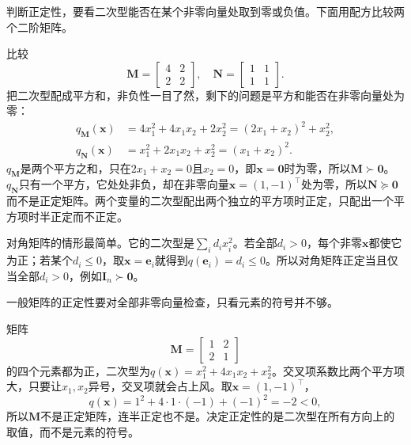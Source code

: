判断正定性，要看二次型能否在某个非零向量处取到零或负值。下面用配方比较两个二阶矩阵。
\begin{example}[用配方区分正定与半正定]
\label{ex:ls-pd-psd-completing-square}
比较
\[
 \bm M=\begin{bmatrix}4&2\\2&2\end{bmatrix},\quad
 \bm N=\begin{bmatrix}1&1\\1&1\end{bmatrix}.
\]
把二次型配成平方和，非负性一目了然，剩下的问题是平方和能否在非零向量处为零：
\[
 \begin{aligned}
 q_{\bm M}(\bm x)&=4x_1^2+4x_1x_2+2x_2^2=(2x_1+x_2)^2+x_2^2,\\
 q_{\bm N}(\bm x)&=x_1^2+2x_1x_2+x_2^2=(x_1+x_2)^2.
 \end{aligned}
\]
$q_{\bm M}$是两个平方之和，只在$2x_1+x_2=0$且$x_2=0$，即$\bm x=\bm0$时为零，所以$\bm M\succ\bm0$。$q_{\bm N}$只有一个平方，它处处非负，却在非零向量$\bm x=(1,-1)^\top$处为零，所以$\bm N\succeq\bm0$而不是正定矩阵。两个变量的二次型配出两个独立的平方项时正定，只配出一个平方项时半正定而不正定。
\end{example}

对角矩阵的情形最简单。它的二次型是$\sum_id_ix_i^2$。若全部$d_i>0$，每个非零$\bm x$都使它为正；若某个$d_i\leq0$，取$\bm x=\bm e_i$就得到$q(\bm e_i)=d_i\leq0$。所以对角矩阵正定当且仅当全部$d_i>0$，例如$\bm I_n\succ\bm0$。

一般矩阵的正定性要对全部非零向量检查，只看元素的符号并不够。
\begin{example}[反例：元素全为正的对称矩阵未必正定]
\label{ex:ls-positive-entries-not-pd}
矩阵
\[
 \bm M=\begin{bmatrix}1&2\\2&1\end{bmatrix}
\]
的四个元素都为正，二次型为$q(\bm x)=x_1^2+4x_1x_2+x_2^2$。交叉项系数比两个平方项大，只要让$x_1,x_2$异号，交叉项就会占上风。取$\bm x=(1,-1)^\top$，
\[
 q(\bm x)=1^2+4\cdot1\cdot(-1)+(-1)^2=-2<0,
\]
所以$\bm M$不是正定矩阵，连半正定也不是。决定正定性的是二次型在所有方向上的取值，而不是元素的符号。
\end{example}

